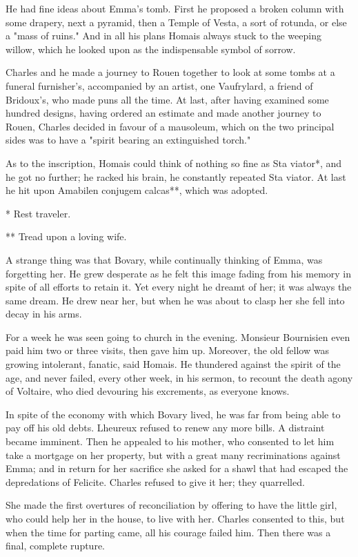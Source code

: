\documentclass[11pt,twocolumn]{ltugboat}
\begin{document}
He had fine ideas about Emma's tomb. First he proposed a broken column
with some drapery, next a pyramid, then a Temple of Vesta, a sort of
rotunda, or else a "mass of ruins." And in all his plans Homais always
stuck to the weeping willow, which he looked upon as the indispensable
symbol of sorrow.

Charles and he made a journey to Rouen together to look at some tombs
at a funeral furnisher's, accompanied by an artist, one Vaufrylard, a
friend of Bridoux's, who made puns all the time. At last, after having
examined some hundred designs, having ordered an estimate and made
another journey to Rouen, Charles decided in favour of a mausoleum,
which on the two principal sides was to have a "spirit bearing an
extinguished torch."

As to the inscription, Homais could think of nothing so fine as Sta
viator*, and he got no further; he racked his brain, he constantly
repeated Sta viator. At last he hit upon Amabilen conjugem calcas**,
which was adopted.

     * Rest traveler.

     ** Tread upon a loving wife.

A strange thing was that Bovary, while continually thinking of Emma, was
forgetting her. He grew desperate as he felt this image fading from his
memory in spite of all efforts to retain it. Yet every night he dreamt
of her; it was always the same dream. He drew near her, but when he was
about to clasp her she fell into decay in his arms.

For a week he was seen going to church in the evening. Monsieur
Bournisien even paid him two or three visits, then gave him up.
Moreover, the old fellow was growing intolerant, fanatic, said Homais.
He thundered against the spirit of the age, and never failed, every
other week, in his sermon, to recount the death agony of Voltaire, who
died devouring his excrements, as everyone knows.

In spite of the economy with which Bovary lived, he was far from being
able to pay off his old debts. Lheureux refused to renew any more
bills. A distraint became imminent. Then he appealed to his mother, who
consented to let him take a mortgage on her property, but with a great
many recriminations against Emma; and in return for her sacrifice she
asked for a shawl that had escaped the depredations of Felicite. Charles
refused to give it her; they quarrelled.

She made the first overtures of reconciliation by offering to have the
little girl, who could help her in the house, to live with her. Charles
consented to this, but when the time for parting came, all his courage
failed him. Then there was a final, complete rupture.
\end{document}
